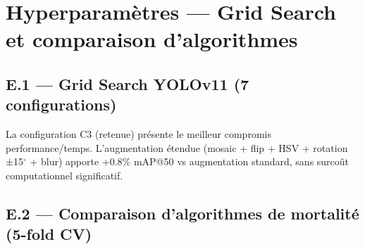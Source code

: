 \chapter{Hyperparamètres — Grid Search et comparaison d'algorithmes}
\label{ann:hyperparams}

\section*{E.1 — Grid Search YOLOv11 (7 configurations)}

\begin{table}[H]
\centering
\caption{Résultats du Grid Search YOLOv11 (7 configurations d'hyperparamètres)}
\label{tab:gs_yolo}
\end{table}

La configuration C3 (retenue) présente le meilleur compromis performance/temps.
L'augmentation étendue (mosaic + flip + HSV + rotation ±15$^{\circ}$ + blur) apporte
+0.8\% mAP@50 vs augmentation standard, sans surcoût computationnel significatif.

\section*{E.2 — Comparaison d'algorithmes de mortalité (5-fold CV)}

